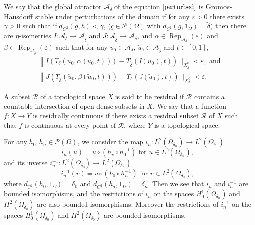\documentclass[11pt]{amsart}
\begin{document}
\begin{definition}
    We say that the global attractor $\mathcal{A}_{\delta}$ of the equation $\eqref{perturbed}$ is Gromov-Hausdorff stable under perturbations of the domain if for any $\varepsilon>0$ there exists $\gamma>0$ such that if $d_{C^{2}}(g,h)<\gamma$, ($g \in \mathcal P(\Omega)$ with $d_{C^2}(g, 1_\Omega)=\tilde{\delta}$) then there are $\eta$-isometries $I: \mathcal{A}_{\delta} \rightarrow \mathcal{A}_{\tilde{\delta}}$ and $J: \mathcal{A}_{\tilde{\delta}} \rightarrow \mathcal{A}_{\delta}$, and $\alpha \in \operatorname{Rep}_{\mathcal{A}_{\delta}}(\varepsilon)$ and $\beta \in \operatorname{Rep}_{\mathcal{A}_{\tilde{\delta}}}(\varepsilon)$ such that for any $u_{0} \in \mathcal{A}_{\delta}$, $\tilde{u}_{0} \in \mathcal{A}_{\tilde{\delta}}$ and $t \in[0,1]$,
$$
\begin{aligned}
& \left\| I\left(T_{\delta}\left(u_{0}, \alpha\left(u_{0}, t\right)\right)\right)-T_{\tilde{\delta}}\left(I\left(u_{0}\right), t\right)\right) \|_{X_{\tilde\delta}^0}<\varepsilon, \text { and } \\
& \left\| J\left(T_{\tilde{\delta}}\left(\tilde{u}_{0}, \beta\left(\tilde{u}_{0}, t\right)\right)\right)-T_{\delta}\left(J\left(\tilde{u}_{0}\right), t\right)\right) \|_{X_\delta^0}<\varepsilon .
\end{aligned}
$$
\end{definition}

A subset $\mathcal{R}$ of a topological space $X$ is said to be residual if $\mathcal{R}$ contains a countable intersection of open dense subsets in $X$. We say that a function $f : X \rightarrow Y$ is residually continuous if
there exists a residual subset $\mathcal{R} $ of $X$ such that $f$ is continuous at every point of $\mathcal{R}$, where $Y$ is a topological space.

For any $h_0, h_n \in \mathcal P(\Omega)$, we consider the map $i_n: L^2(\Omega_{\delta_n})\rightarrow L^2(\Omega_{\delta_0})$
$$i_n(u) =u\circ(h_n\circ h_0^{-1}) \text { for } u \in L^2(\Omega_{\delta_n}),$$
and its inverse $i_n^{-1}: L^2(\Omega_{\delta_0})\rightarrow L^2(\Omega_{\delta_n})$
$$i_n^{-1}(v) =v\circ(h_0\circ h_n^{-1}) \text { for } v \in L^2(\Omega_{\delta_0}), $$
where $d_{C^2}(h_0, 1_\Omega)=\delta_0$ and $d_{C^2}(h_n, 1_\Omega) =\delta_n$.
Then we see that $i_n$ and $i_n^{-1}$ are bounded isomorphisms, and the restrictions of $i_n$ on the spaces $H^1_0(\Omega_{\delta_n})$ and $H^2({\Omega_{\delta_n}})$  are also bounded isomorphisms. Moreover 
the restrictions of $i_n^{-1}$ on the spaces $H^1_0(\Omega_{\delta_0})$ and $H^2({\Omega_{\delta_0}})$  are  bounded isomorphisms.
\end{document}
